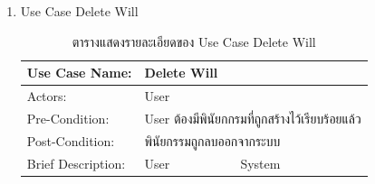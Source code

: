 \documentclass[12pt,oneside,openright,a4paper]{cpe-thai-project}
\begin{document}
\begin{enumerate}[label=\thesubsection.\arabic*,leftmargin=0pt,itemindent=1.25cm]
\begin{table}[h]
\begin{tabularx}{\textwidth}{|l|X|X|}
\hline
Exception:         &                                                             \\
\hline
\end{tabularx}
\end{table}
\FloatBarrier
\item Use Case Delete Will
	\begin{table}[h]
\centering
\caption{ตารางแสดงรายละเอียดของ Use Case Delete Will}
\begin{tabularx}{\textwidth}{|l|X|X|} 
\hline
Use Case Name:     & \multicolumn{2}{l|}{Delete Will}                                                                                                                                                                                                                                                          \\ 
\hline
Actors:            & \multicolumn{2}{l|}{User}                                                                                                                                                                                                                                                                 \\ 
\hline
Pre-Condition:     & \multicolumn{2}{l|}{User ต้องมีพินัยกกรมที่ถูกสร้างไว้เรียบร้อยแล้ว}                                                                                                                                                                                                                      \\ 
\hline
Post-Condition:    & \multicolumn{2}{l|}{พินัยกรรมถูกลบออกจากระบบ}                                                                                                                                                                                                                                             \\ 
\hline
Brief Description: & User                                                                                                                                                       & System                                                                                                                       \\ 

\end{tabularx}
\end{table}
\end{enumerate}
\end{document}
